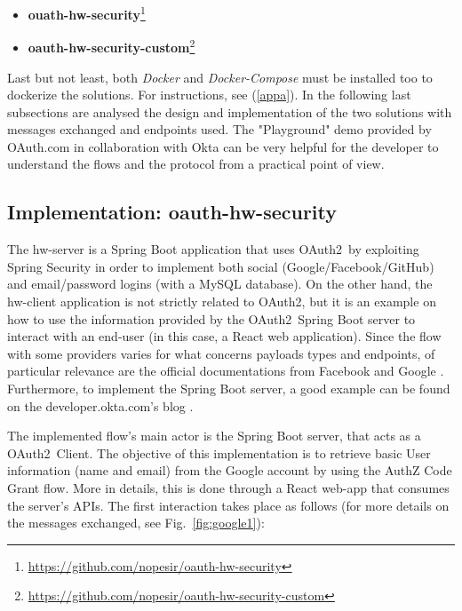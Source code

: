 \documentclass[a4paper,12pt]{article}
\def\oauth{OAuth2\xspace}
\def\myfig#1{Fig.~#1\xspace}
\begin{document}
\begin{itemize}
    \item \textbf{ouath-hw-security}\footnote{\url{https://github.com/nopesir/oauth-hw-security}}
    \item \textbf{oauth-hw-security-custom}\footnote{\url{https://github.com/nopesir/oauth-hw-security-custom}}
\end{itemize}

Last but not least, both \textit{Docker} and \textit{Docker-Compose} must be installed too to dockerize the solutions. For instructions, see (\ref{appa}). In the following last subsections are analysed the design and implementation of the two solutions with messages exchanged and endpoints used. The "Playground" demo provided by OAuth.com in collaboration with Okta \cite{playgr} can be very helpful for the developer to understand the flows and the protocol from a practical point of view. 

\subsection{Implementation: oauth-hw-security}
The hw-server is a Spring Boot application that uses \oauth\ by exploiting Spring Security in order to implement both social (Google/Facebook/GitHub) and email/password logins (with a MySQL database). On the other hand, the hw-client application is not strictly related to \oauth, but it is an example on how to use the information provided by the \oauth\ Spring Boot server to interact with an end-user (in this case, a React web application). Since the flow with some providers varies for what concerns payloads types and endpoints, of particular relevance are the official documentations from Facebook \cite{facebook} and Google \cite{google1, google2}. Furthermore, to implement the Spring Boot server, a good example can be found on the developer.okta.com's blog \cite{sprboot}. 

The implemented flow's main actor is the Spring Boot server, that acts as a \oauth\ Client. The objective of this implementation is to retrieve basic User information (name and email) from the Google account by using the AuthZ Code Grant flow. More in details, this is done through a React web-app that consumes the server's APIs. The first interaction takes place as follows (for more details on the messages exchanged, see \myfig{\ref{fig:google1}}):
\end{document}
